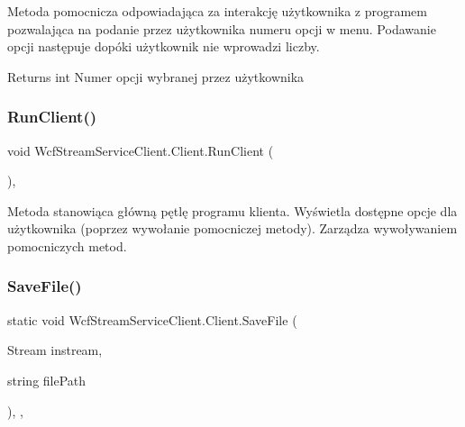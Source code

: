 Metoda pomocnicza odpowiadająca za interakcję użytkownika z programem pozwalająca na podanie przez użytkownika numeru opcji w menu. Podawanie opcji następuje dopóki użytkownik nie wprowadzi liczby. 

\begin{DoxyReturn}{Returns}
int Numer opcji wybranej przez użytkownika
\end{DoxyReturn}
\mbox{\label{class_wcf_stream_service_client_1_1_client_af48e3d7be49a0136ad495035415e799f}} 
\subsubsection{\texorpdfstring{Run\+Client()}{RunClient()}}
{\footnotesize\ttfamily void Wcf\+Stream\+Service\+Client.\+Client.\+Run\+Client (\begin{DoxyParamCaption}{ }\end{DoxyParamCaption})\hspace{0.3cm}{\ttfamily [inline]}, {\ttfamily [private]}}



Metoda stanowiąca główną pętlę programu klienta. Wyświetla dostępne opcje dla użytkownika (poprzez wywołanie pomocniczej metody). Zarządza wywoływaniem pomocniczych metod. 

\mbox{\label{class_wcf_stream_service_client_1_1_client_ac54e9d85bbd737536ca281cedfc8d87c}} 
\subsubsection{\texorpdfstring{Save\+File()}{SaveFile()}}
{\footnotesize\ttfamily static void Wcf\+Stream\+Service\+Client.\+Client.\+Save\+File (\begin{DoxyParamCaption}\item[{Stream}]{instream,  }\item[{string}]{file\+Path }\end{DoxyParamCaption})\hspace{0.3cm}{\ttfamily [inline]}, {\ttfamily [static]}, {\ttfamily [private]}}



